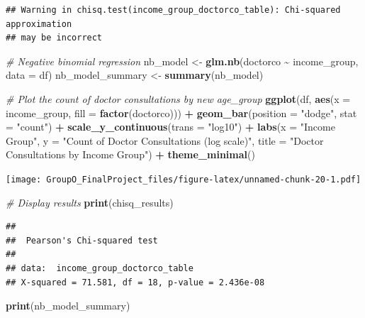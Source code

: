 \documentclass[
]{article}
\newenvironment{Shaded}{\begin{snugshade}}{\end{snugshade}}
\newcommand{\AttributeTok}[1]{\textcolor[rgb]{0.13,0.29,0.53}{#1}}
\newcommand{\CommentTok}[1]{\textcolor[rgb]{0.56,0.35,0.01}{\textit{#1}}}
\newcommand{\FunctionTok}[1]{\textcolor[rgb]{0.13,0.29,0.53}{\textbf{#1}}}
\newcommand{\NormalTok}[1]{#1}
\newcommand{\OtherTok}[1]{\textcolor[rgb]{0.56,0.35,0.01}{#1}}
\newcommand{\SpecialCharTok}[1]{\textcolor[rgb]{0.81,0.36,0.00}{\textbf{#1}}}
\newcommand{\StringTok}[1]{\textcolor[rgb]{0.31,0.60,0.02}{#1}}
\begin{document}
\begin{verbatim}
## Warning in chisq.test(income_group_doctorco_table): Chi-squared approximation
## may be incorrect
\end{verbatim}

\begin{Shaded}
\begin{Highlighting}[]
\CommentTok{\# Negative binomial regression}
\NormalTok{nb\_model }\OtherTok{\textless{}{-}} \FunctionTok{glm.nb}\NormalTok{(doctorco }\SpecialCharTok{\textasciitilde{}}\NormalTok{ income\_group, }\AttributeTok{data =}\NormalTok{ df)}
\NormalTok{nb\_model\_summary }\OtherTok{\textless{}{-}} \FunctionTok{summary}\NormalTok{(nb\_model)}

\CommentTok{\# Plot the count of doctor consultations by new age\_group}
\FunctionTok{ggplot}\NormalTok{(df, }\FunctionTok{aes}\NormalTok{(}\AttributeTok{x =}\NormalTok{ income\_group, }\AttributeTok{fill =} \FunctionTok{factor}\NormalTok{(doctorco))) }\SpecialCharTok{+} 
  \FunctionTok{geom\_bar}\NormalTok{(}\AttributeTok{position =} \StringTok{"dodge"}\NormalTok{, }\AttributeTok{stat =} \StringTok{"count"}\NormalTok{) }\SpecialCharTok{+}
  \FunctionTok{scale\_y\_continuous}\NormalTok{(}\AttributeTok{trans =} \StringTok{"log10"}\NormalTok{) }\SpecialCharTok{+}
  \FunctionTok{labs}\NormalTok{(}\AttributeTok{x =} \StringTok{"Income Group"}\NormalTok{, }\AttributeTok{y =} \StringTok{"Count of Doctor Consultations (log scale)"}\NormalTok{, }\AttributeTok{title =} \StringTok{"Doctor Consultations by Income Group"}\NormalTok{) }\SpecialCharTok{+}
  \FunctionTok{theme\_minimal}\NormalTok{()}
\end{Highlighting}
\end{Shaded}

\texttt{[image: GroupO\_FinalProject\_files/figure-latex/unnamed-chunk-20-1.pdf]}

\begin{Shaded}
\begin{Highlighting}[]
\CommentTok{\# Display results}
\FunctionTok{print}\NormalTok{(chisq\_results)}
\end{Highlighting}
\end{Shaded}

\begin{verbatim}
## 
##  Pearson's Chi-squared test
## 
## data:  income_group_doctorco_table
## X-squared = 71.581, df = 18, p-value = 2.436e-08
\end{verbatim}

\begin{Shaded}
\begin{Highlighting}[]
\FunctionTok{print}\NormalTok{(nb\_model\_summary)}
\end{Highlighting}
\end{Shaded}
\end{document}
